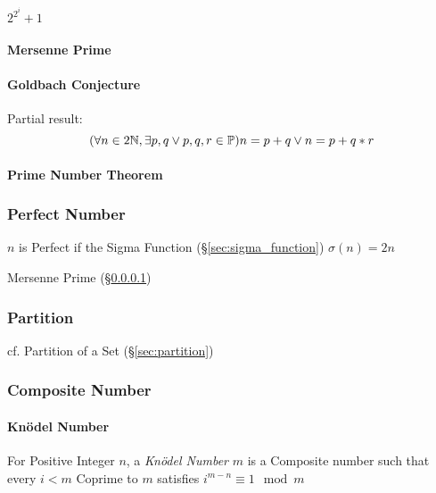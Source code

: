 $2^{2^i} + 1$



\paragraph{Mersenne Prime}\label{sec:mersenne_prime}\hfill

\paragraph{Goldbach Conjecture}\label{sec:goldbach_conjecture}\hfill

Partial result:
\[
  (\forall n \in 2\mathbb{N}, \exists p,q \vee p,q,r \in \mathbb{P})
  n = p + q \vee n = p + q * r
\]



\paragraph{Prime Number Theorem}\label{sec:prime_number_theorem}\hfill



\subsubsection{Perfect Number}\label{sec:perfect_number}

$n$ is Perfect if the Sigma Function (\S\ref{sec:sigma_function})
$\sigma(n) = 2n$

Mersenne Prime (\S\ref{sec:mersenne_prime})



\subsubsection{Partition}\label{sec:integer_partition}

cf. Partition of a Set (\S\ref{sec:partition})



\subsubsection{Composite Number}\label{sec:composite_number}

\paragraph{Kn\"odel Number}\label{sec:knodel_number}\hfill

For Positive Integer $n$, a \emph{Kn\"odel Number} $m$ is a Composite
number such that every $i < m$ Coprime to $m$ satisfies $i^{m-n}
\equiv 1 \mod m$

